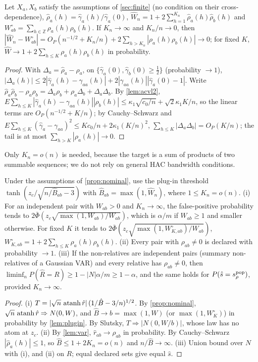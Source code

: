 \begin{lemma}\label{lem:plugin}
Let $X_a,X_b$ satisfy the assumptions of \cref{sec:finite} (no condition on their cross-dependence),
$\hat\rho_a(h)=\hat\gamma_a(h)/\hat\gamma_a(0)$, $\hat W_n=1+2\sum_{h=1}^{K_n}\hat\rho_a(h)\hat\rho_b(h)$ and
$W^\circ_{ab}=\sum_{h\in\mathbb Z}\rho_a(h)\rho_b(h)$. If $K_n\to\infty$ and $K_n/n\to0$, then
$|\hat W_n-W^\circ_{ab}|=O_P(n^{-1/2}+K_n/n)+2\sum_{h>K_n}|\rho_a(h)\rho_b(h)|\to0$; for fixed $K$,
$\hat W\to1+2\sum_{h\le K}\rho_a(h)\rho_b(h)$ in probability.
\end{lemma}
\begin{proof}
With $\Delta_a=\hat\rho_a-\rho_a$, on $\{\hat\gamma_a(0),\hat\gamma_b(0)\ge\frac12\}$ (probability $\to1$),
$|\Delta_a(h)|\le2|\hat\gamma_a(h)-\gamma_{aa}(h)|+2|\gamma_{aa}(h)||\hat\gamma_a(0)-1|$. Write
$\hat\rho_a\hat\rho_b-\rho_a\rho_b=\Delta_a\rho_b+\rho_a\Delta_b+\Delta_a\Delta_b$. By \cref{lem:acvl2},
$E\sum_{h\le K}|\hat\gamma_a(h)-\gamma_{aa}(h)||\rho_b(h)|\le\kappa_1\sqrt{c_0/n}+\sqrt2\kappa_1K/n$, so the linear terms
are $O_P(n^{-1/2}+K/n)$; by Cauchy--Schwarz and $E\sum_{h\le K}(\hat\gamma_a-\gamma_{aa})^2\le Kc_0/n+2\kappa_1(K/n)^2$,
$\sum_{h\le K}|\Delta_a\Delta_b|=O_P(K/n)$; the tail is at most $\sum_{h>K}|\rho_a(h)|\to0$.
\end{proof}
Only $K_n=o(n)$ is needed, because the target is a sum of products of two summable sequences; we do not rely on
general HAC bandwidth conditions.

\begin{proposition}\label{prop:plugin}
Under the assumptions of \cref{prop:nominal}, use the plug-in threshold $\tanh(z_c/\sqrt{n/\hat B_{ab}-3})$ with
$\hat B_{ab}=\max(1,\hat W_n)$, where $1\le K_n=o(n)$.
(i) For an independent pair with $W_{ab}>0$ and $K_n\to\infty$, the false-positive probability tends to
$2\bar\Phi(z_c\sqrt{\max(1,W_{ab})/W_{ab}})$, which is $\alpha/m$ if $W_{ab}\ge1$ and smaller otherwise. For fixed $K$ it
tends to $2\bar\Phi(z_c\sqrt{\max(1,W^\circ_{K,ab})/W_{ab}})$, $W^\circ_{K,ab}=1+2\sum_{h\le K}\rho_a(h)\rho_b(h)$.
(ii) Every pair with $\rho_{ab}\ne0$ is declared with probability $\to1$.
(iii) If the non-relatives are independent pairs (summary non-relatives of a Gaussian VAR) and every relative has
$\rho_{ab}\ne0$, then $\liminf_nP(\hat R=R)\ge1-|N|\alpha/m\ge1-\alpha$, and the same holds for
$P(\hat s=\srho^{\mathrm{pop}})$, provided $K_n\to\infty$.
\end{proposition}
\begin{proof}
(i) $T=|\sqrt n\,\atanh\hat r|\,(1/\hat B-3/n)^{1/2}$. By \cref{prop:nominal}, $\sqrt n\,\atanh\hat r\Rightarrow N(0,W)$,
and $\hat B\to b=\max(1,W)$ (or $\max(1,W^\circ_K)$) in probability by \cref{lem:plugin}. By Slutsky,
$T\Rightarrow|N(0,W/b)|$, whose law has no atom at $z_c$. (ii) By \cref{lem:var}, $\hat r_{ab}\to\rho_{ab}$ in
probability. By Cauchy--Schwarz $|\hat\rho_a(h)|\le1$, so $\hat B\le1+2K_n=o(n)$ and $n/\hat B\to\infty$.
(iii) Union bound over $N$ with (i), and (ii) on $R$; equal declared sets give equal $\hat s$.
\end{proof}

